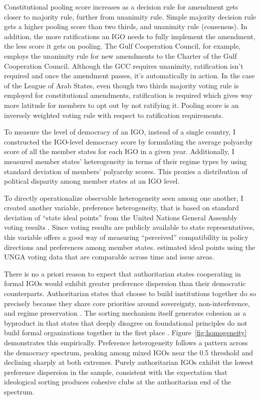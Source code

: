 \documentclass[12pt]{article}
\begin{document}
Constitutional pooling score increases as a decision rule for amendment gets closer to majority rule, further from unanimity rule. Simple majority decision rule gets a higher pooling score than two thirds, and unanimity rule (consensus). In addition, the more ratifications an IGO needs to fully implement the amendment, the less score it gets on pooling. The Gulf Cooperation Council, for example, employs the unanimity rule for new amendments to the Charter of the Gulf Cooperation Council. Although the GCC requires unanimity, ratification isn't required and once the amendment passes, it's automatically in action. In the case of the League of Arab States, even though two thirds majority voting rule is employed for constitutional amendments, ratification is required which gives way more latitude for members to opt out by not ratifying it. Pooling score is an inversely weighted voting rule with respect to ratification requirements.



To measure the level of democracy of an IGO, instead of a single country, I constructed the IGO-level democracy score by formulating the average polyarchy score of all the member states for each IGO in a given year. Additionally, I measured member states' heterogeneity in terms of their regime types by using standard deviation of members' polyarchy scores. This proxies a distribution of political disparity among member states at an IGO level. 


To directly operationalize observable heterogeneity seen among one another, I created another variable, preference heterogeneity, that is based on standard deviation of ``state ideal points'' from the United Nations General Assembly voting results \parencite{bailey_estimating_2017, voeten_clashes_2000}. Since voting results are publicly available to state representatives, this variable offers a good way of measuring ``perceived'' compatibility in policy directions and preferences among member states. \textcite{bailey_estimating_2017} estimated ideal points using the UNGA voting data that are comparable across time and issue areas.

There is no a priori reason to expect that authoritarian states cooperating in formal IGOs would exhibit greater preference dispersion than their democratic counterparts. Authoritarian states that choose to build institutions together do so precisely because they share core priorities around sovereignty, non-interference, and regime preservation \parencite{obydenkova_authoritarian_2019, debre_are_2025}. The sorting mechanism itself generates cohesion as a byproduct in that states that deeply disagree on foundational principles do not build formal organizations together in the first place \parencite{mansfield_democratization_2006, tallberg_democracy_2025}. Figure~\ref{fig:homogeneity} demonstrates this empirically. Preference heterogeneity follows a pattern across the democracy spectrum, peaking among mixed IGOs near the 0.5 threshold and declining sharply at both extremes. Purely authoritarian IGOs exhibit the lowest preference dispersion in the sample, consistent with the expectation that ideological sorting produces cohesive clubs at the authoritarian end of the spectrum.
\end{document}
